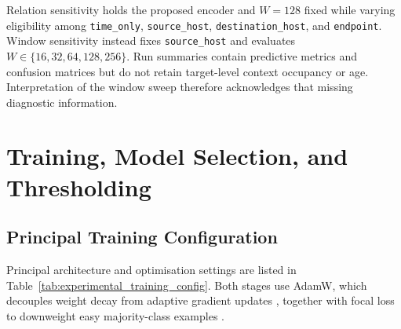 \documentclass[11pt,fleqn]{report}
\begin{document}
Relation sensitivity holds the proposed encoder and $W=128$ fixed while varying eligibility among \texttt{time\_only}, \texttt{source\_host}, \texttt{destination\_host}, and \texttt{endpoint}. Window sensitivity instead fixes \texttt{source\_host} and evaluates $W\in\{16,32,64,128,256\}$. Run summaries contain predictive metrics and confusion matrices but do not retain target-level context occupancy or age. Interpretation of the window sweep therefore acknowledges that missing diagnostic information.

\section{Training, Model Selection, and Thresholding}
\label{subsec:experimental_training_protocol}

\subsection{Principal Training Configuration}
\label{subsubsec:principal_training_config}

Principal architecture and optimisation settings are listed in Table~\ref{tab:experimental_training_config}. Both stages use AdamW, which decouples weight decay from adaptive gradient updates \cite{Loshchilov2019AdamW}, together with focal loss to downweight easy majority-class examples \cite{Lin2017FocalLoss}.
\end{document}
